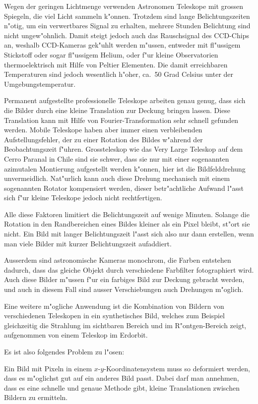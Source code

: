 Wegen der geringen Lichtmenge verwenden Astronomen Teleskope mit
grossen Spiegeln, die viel Licht sammeln k"onnen. Trotzdem sind lange
Belichtungszeiten n"otig, um ein verwertbares Signal zu erhalten,
mehrere Stunden Belichtung sind nicht ungew"ohnlich.
Damit steigt jedoch auch das Rauschsignal des CCD-Chips an, weshalb
CCD-Kameras gek"uhlt werden m"ussen, entweder mit fl"ussigem Stickstoff
oder sogar fl"ussigem Helium, oder f"ur kleine Observatorien thermoelektrisch
mit Hilfe von Peltier Elementen.
Die damit erreichbaren Temperaturen sind jedoch wesentlich h"oher,
ca.~50 Grad Celsius unter der Umgebungstemperatur.

Permanent aufgestellte professionelle Teleskope arbeiten genau
genug, dass sich die Bilder durch eine kleine Translation zur
Deckung bringen lassen.
Diese Translation kann mit Hilfe von Fourier-Transformation sehr
schnell gefunden werden.
Mobile Teleskope haben aber immer einen verbleibenden Aufstellungsfehler,
der zu einer Rotation des Bildes w"ahrend der Beobachtungszeit f"uhren.
Grossteleskop wie das Very Large Teleskop auf dem Cerro Paranal in
Chile sind sie schwer, dass sie nur mit einer sogenannten azimutalen
Montierung aufgestellt werden k"onnen, hier ist die Bildfelddrehung
unvermeidlich.
Nat"urlich kann auch diese Drehung mechanisch mit einem sogenannten
Rotator kompensiert werden, dieser betr"achtliche Aufwand l"asst sich
f"ur kleine Teleskope jedoch nicht rechtfertigen.

Alle diese Faktoren limitiert die Belichtungszeit auf wenige Minuten.
Solange die Rotation in den
Randbereichen eines Bildes kleiner als ein Pixel bleibt, st"ort
sie nicht.
Ein Bild mit langer Belichtungszeit l"asst sich also nur dann erstellen,
wenn man viele Bilder mit kurzer Belichtungszeit aufaddiert.

Ausserdem sind astronomische Kameras monochrom, die Farben entstehen
dadurch, dass das gleiche Objekt durch verschiedene Farbfilter fotographiert
wird. Auch diese Bilder m"ussen f"ur ein farbiges Bild zur Deckung
gebracht werden, und auch in diesem Fall sind ausser Verschiebungen
auch Drehungen m"oglich. 

Eine weitere m"ogliche Anwendung ist die Kombination von Bildern von
verschiedenen Teleskopen in ein synthetisches Bild, welches zum Beispiel
gleichzeitig die Strahlung im sichtbaren Bereich und im R"ontgen-Bereich
zeigt, aufgenommen von einem Teleskop im Erdorbit.

Es ist also folgendes Problem zu l"osen:

\begin{aufgabe}
Ein Bild mit Pixeln in einem
$x$-$y$-Koordinatensystem muss so deformiert werden, dass es m"oglichst
gut auf ein anderes Bild passt. Dabei darf man annehmen, dass es eine
schnelle und genaue Methode gibt, kleine Translationen zwischen Bildern 
zu ermitteln.
\end{aufgabe}

